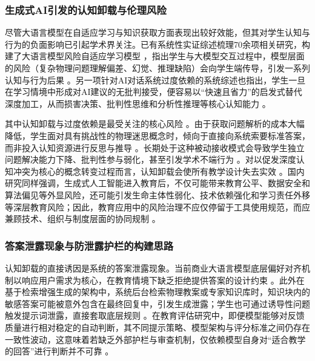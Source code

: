 \subsubsection{生成式AI引发的认知卸载与伦理风险}

尽管大语言模型在自适应学习与知识获取方面表现出较好效能，但其对学生认知与行为的负面影响已引起学术界关注。已有系统性实证综述梳理70余项相关研究，构建了大语言模型风险自适应学习模型 \citep{ref14}，指出学生与大模型交互过程中，模型层面的风险（复杂物理问题理解偏差、幻觉、推理缺陷）会向学生端传导，引发一系列认知与行为后果 \citep{ref14}。另一项针对AI对话系统过度依赖的系统综述也指出，学生一旦在学习情境中形成对AI建议的无批判接受，便容易以“快速且省力”的启发式替代深度加工，从而损害决策、批判性思维和分析性推理等核心认知能力 \citep{zhai2024overreliance}。

其中认知卸载与过度依赖是最受关注的核心风险 \citep{ref13}。由于获取问题解析的成本大幅降低，学生面对具有挑战性的物理迷思概念时，倾向于直接向系统索要标准答案，而非投入认知资源进行反思与推导 \citep{ref14}。长期处于这种被动接收模式会导致学生独立问题解决能力下降、批判性参与弱化，甚至引发学术不端行为 \citep{ref13}。对以促发深度认知冲突为核心的概念转变过程而言，认知卸载会使所有教学设计失去实效 \citep{ref14}。国内研究同样强调，生成式人工智能进入教育后，不仅可能带来教育公平、数据安全和算法偏见等外显风险，还可能引发生命主体性弱化、技术依赖强化和学习责任外移等深层教育风险；因此，教育应用中的风险治理不应仅停留于工具使用规范，而应兼顾技术、组织与制度层面的协同规制 \citep{liuji2024risk,zhanghaipeng2025toe}。

\subsubsection{答案泄露现象与防泄露护栏的构建思路}

认知卸载的直接诱因是系统的答案泄露现象。当前商业大语言模型底层偏好对齐机制以响应用户需求为核心，在教育情境下缺乏拒绝提供答案的设计约束 \citep{ref20}。此外在基于检索增强生成的架构中，系统后台检索物理教案或专家知识库时，知识块内的敏感答案可能被意外包含在最终回复中，引发生成泄露；学生也可通过诱导性问题触发提示词泄露，直接套取底层规则 \citep{ref26}。在教育评估研究中，即便模型能够对反馈质量进行相对稳定的自动判断，其不同提示策略、模型架构与评分标准之间仍存在一致性波动，这意味着若缺乏外部护栏与审查机制，仅依赖模型自身对“适合教学的回答”进行判断并不可靠 \citep{seo2025llmevaluators}。

